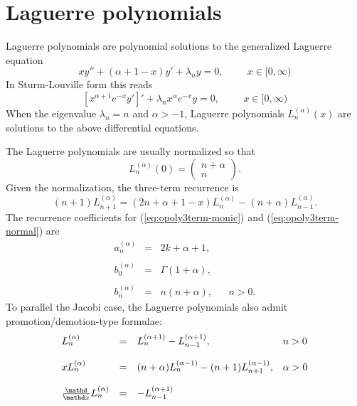 \section{Laguerre polynomials}

\label{app:polynomials-laguerre}Laguerre polynomials are polynomial solutions
to the generalized Laguerre equation
\[ xy'' + (\alpha + 1 - x) y' + \lambda_n y = 0, \hspace{1cm} x \in [0,
   \infty) \]
In Sturm-Louville form this reads
\[ \left[ x^{\alpha + 1} e^{- x} y' \right]' + \lambda_n x^{\alpha} e^{- x} y
   = 0, \hspace{1cm} x \in [0, \infty) \]
When the eigenvalue $\lambda_n = n$ and $\alpha > - 1$, Laguerre polynomials
$L_n^{(\alpha)} (x)$ are solutions to the above differential equations.



The Laguerre polynomials are usually normalized so that
\[ L_n^{(\alpha)} (0) = \left( \begin{array}{c}
     n + \alpha\\
     n
   \end{array} \right) . \]
Given the normalization, the three-term recurrence is
\[ (n + 1) L_{n + 1}^{(\alpha)} = (2 n + \alpha + 1 - x) L_n^{(\alpha)} - (n
   + \alpha) L_{n - 1}^{(\alpha)} . \]
The recurrence coefficients for (\ref{eq:opoly3term-monic}) and
(\ref{eq:opoly3term-normal}) are
\[ \begin{array}{lllll}
     a^{(\alpha)}_n & = & 2 k + \alpha + 1, &  & \\
     &  &  &  & \\
     b^{(\alpha)}_0 & = & \Gamma (1 + \alpha), &  & \\
     &  &  &  & \\
     b^{(\alpha)}_n & = & n (n + \alpha), &  & n > 0.
   \end{array} \]
To parallel the Jacobi case, the Laguerre polynomials also admit
promotion/demotion-type formulae:
\[ \begin{array}{llll}
     L_n^{(\alpha)} & = & L_n^{(\alpha + 1)} - L_{n - 1}^{(\alpha + 1)}, & n >
     0\\
     &  &  & \\
     xL_n^{(\alpha)} & = & (n + \alpha) L_n^{(\alpha - 1)} - (n + 1) L_{n +
     1}^{(\alpha - 1)}, & \alpha > 0\\
     &  &  & \\
     \frac{\mathd}{\mathd x} L_n^{(\alpha)} & = & - L_{n - 1}^{(\alpha + 1)} &
     
   \end{array} \]
